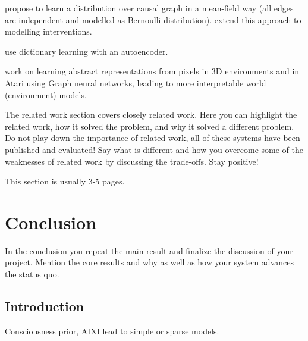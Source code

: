 \documentclass[a4paper,11pt,oneside]{report}
\begin{document}
\cite{kalainathan2018structural, ng2019masked} propose to learn a distribution over causal graph in a mean-field way (all edges are independent and modelled as Bernoulli distribution). \cite{Brouillard2020} extend this approach to modelling interventions.

\cite{Fallah2020} use dictionary learning with an autoencoder.

\cite{kipf2019contrastive} work on learning abstract representations from pixels in 3D environments and in Atari using Graph neural networks, leading to more interpretable world (environment) models.

The related work section covers closely related work. Here you can highlight
the related work, how it solved the problem, and why it solved a different
problem. Do not play down the importance of related work, all of these
systems have been published and evaluated! Say what is different and how
you overcome some of the weaknesses of related work by discussing the
trade-offs. Stay positive!

This section is usually 3-5 pages.


\chapter{Conclusion}
\label{ch:conclusion}

In the conclusion you repeat the main result and finalize the discussion of
your project. Mention the core results and why as well as how your system
advances the status quo.

\cleardoublepage
{}
{}
\printbibliography

%
%

\section{Introduction}
Consciousness prior, AIXI lead to simple or sparse models.
\end{document}
